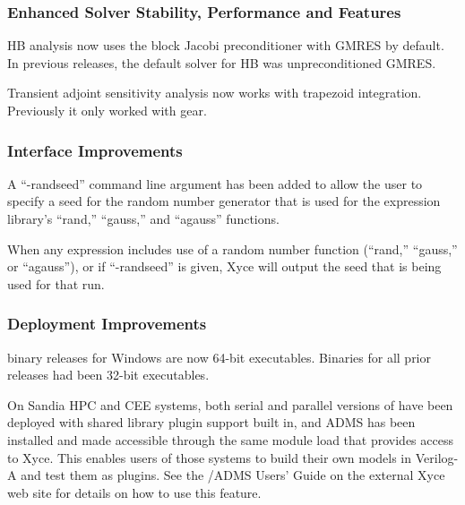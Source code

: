 \documentclass{article}
\begin{document}
\subsubsection*{Enhanced Solver Stability, Performance and Features}
\begin{XyceItemize}
     \item HB analysis now uses the block Jacobi preconditioner with GMRES by
          default.  In previous releases, the default solver for HB was
          unpreconditioned GMRES.
     \item Transient adjoint sensitivity analysis now works with trapezoid
          integration.  Previously it only worked with gear.
\end{XyceItemize}

\subsubsection*{Interface Improvements}
\begin{XyceItemize}
     \item A ``-randseed'' command line argument has been added to allow the
          user to specify a seed for the random number generator that is used
          for the expression library's ``rand,'' ``gauss,'' and ``agauss''
          functions.
     \item When any expression includes use of a random number function (``rand,''
          ``gauss,'' or ``agauss''), or if ``-randseed'' is given, Xyce will
          output the seed that is being used for that run.
\end{XyceItemize}

\subsubsection*{Deployment Improvements}
\begin{XyceItemize}
     \item \Xyce{} binary releases for Windows are now 64-bit executables.
          Binaries for all prior releases had been 32-bit executables.
     \item On Sandia HPC and CEE systems, both serial and parallel versions of
          \Xyce{} have been deployed with shared library plugin support built
          in, and ADMS has been installed and made accessible through the same
          module load that provides access to Xyce.  This enables \Xyce{} users
          of those systems to build their own models in Verilog-A and test them
          as plugins.  See the \Xyce{}/ADMS Users' Guide on the external Xyce
          web site for details on how to use this feature.
\end{XyceItemize}
\end{document}
